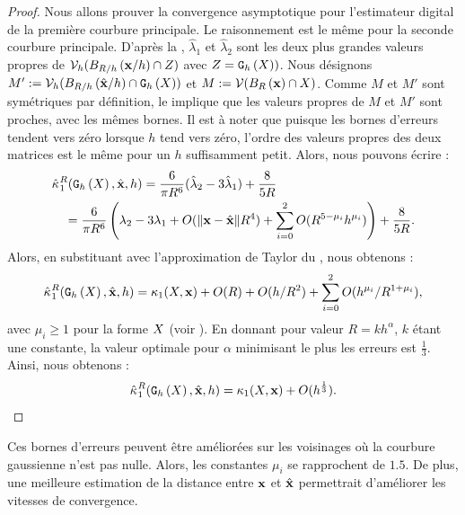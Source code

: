 \begin{proof}
  Nous allons prouver la convergence asymptotique pour l'estimateur digital de la
  première courbure principale. Le raisonnement est le même pour la seconde
  courbure principale. D'après la ,
  $\hat{\lambda}_1$ et $\hat{\lambda}_2$ sont les deux plus grandes valeurs
  propres de $\DCov{h}(\Ball{R/h}{\vx / h} \cap \DigShape)$ avec
  $Z=\DigF{X}{h})$. Nous désignons $M' \EqDef \DCov{h}(\Ball{R/h}{\hat{\vx}/h}
  \cap \DSh)$ et $M \EqDef \Cov(\Ball{R}{\vx} \cap \Shape )$. Comme $M$ et $M'$
  sont symétriques par définition, le  implique que
  les valeurs propres de $M$ et $M'$ sont proches, avec les mêmes bornes. Il est à
  noter que puisque les bornes d'erreurs tendent vers zéro lorsque $h$ tend vers
  zéro, l'ordre des valeurs propres des deux matrices est le même pour un $h$
  suffisamment petit. Alors, nous pouvons écrire :
  \begin{align}
    &\PrincCurvH{1}{R}(\DSh,\hat{\vx},h) = \frac{6}{\pi R^6}(\hat{\lambda}_2 - 3\hat{\lambda}_1) + \frac{8}{5R} \\
    &\quad = \frac{6}{\pi R^6} \left( \lambda_2 - 3\lambda_1 + O(\|\vx-\hat{\vx}\| R^4) + \sum_{i=0}^2 O(R^{5-\mu_i}h^{\mu_i}) \right) + \frac{8}{5R}.
  \end{align}
  Alors, en substituant avec l'approximation de Taylor du
  , nous obtenons :
  \begin{equation} \label{eq:error-term-conv-mean-curv-est}
    \PrincCurvH{1}{R}(\DSh,\hat{\vx},h) = \PrincCurv{1}(\Shape,\vx) + O(R) + O( h/R^2) + \sum_{i=0}^2 O(h^{\mu_i}/R^{1+\mu_i}) ,
  \end{equation}
  avec $\mu_i \ge 1$ pour la forme $\Shape$ (voir
  ). En donnant pour valeur $R =
  kh^\alpha$, $k$ étant une constante, la valeur optimale pour $\alpha$
  minimisant le plus les erreurs est $\frac{1}{3}$. Ainsi, nous obtenons :
  \begin{equation}
    \PrincCurvH{1}{R}(\DSh,\hat{\vx},h) = \PrincCurv{1}(\Shape,\vx) + O(h^{\frac{1}{3}}).
  \end{equation}
\end{proof}

Ces bornes d'erreurs peuvent être améliorées sur les
voisinages où la courbure gaussienne n'est pas nulle. Alors, les constantes
$\mu_i$ se rapprochent de $1.5$. De plus, une meilleure estimation de la
distance entre $\vx$ et $\hat{\vx}$ permettrait d'améliorer les vitesses de
convergence.


